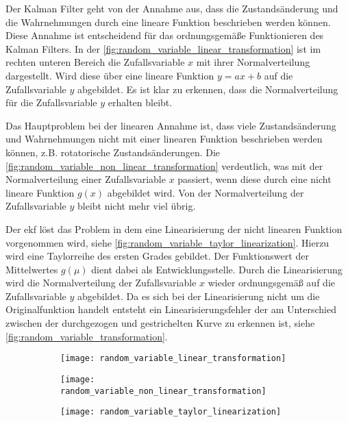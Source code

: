 Der Kalman Filter geht von der Annahme aus, dass die Zustandsänderung und die Wahrnehmungen durch eine lineare Funktion beschrieben werden können. Diese Annahme ist entscheidend für das ordnungsgemäße Funktionieren des Kalman Filters. In der \autoref{fig:random_variable_linear_transformation} ist im rechten unteren Bereich die Zufallsvariable $x$ mit ihrer Normalverteilung dargestellt. Wird diese über eine lineare Funktion $y=ax+b$ auf die Zufallsvariable $y$ abgebildet. Es ist klar zu erkennen, dass die Normalverteilung für die Zufallsvariable $y$ erhalten bleibt.

Das Hauptproblem bei der linearen Annahme ist, dass viele Zustandsänderung und Wahrnehmungen nicht mit einer linearen Funktion beschrieben werden können, z.B. rotatorische Zustandsänderungen. Die \autoref{fig:random_variable_non_linear_transformation} verdeutlich, was mit der Normalverteilung einer Zufallsvariable $x$ passiert, wenn diese durch eine nicht lineare Funktion $g(x)$ abgebildet wird. Von der Normalverteilung der Zufallsvariable $y$ bleibt nicht mehr viel übrig.

Der \Gls{ekf} löst das Problem in dem eine Linearisierung der nicht linearen Funktion vorgenommen wird, siehe \autoref{fig:random_variable_taylor_linearization}. Hierzu wird eine Taylorreihe des ersten Grades gebildet. Der Funktionswert der Mittelwertes $g(\mu)$ dient dabei als Entwicklungsstelle. Durch die Linearisierung wird die Normalverteilung der Zufallsvariable $x$ wieder ordnungsgemäß auf die Zufallsvariable $y$ abgebildet. Da es sich bei der Linearisierung nicht um die Originalfunktion handelt entsteht ein Linearisierungsfehler der am Unterschied zwischen der durchgezogen und gestrichelten Kurve zu erkennen ist, siehe \autoref{fig:random_variable_transformation}.

\begin{figure}
	\centering
	\begin{subfigure}{0.49\linewidth}
		\centering
		\texttt{[image: random\_variable\_linear\_transformation]}
		\caption{}
		\label{fig:random_variable_linear_transformation}
	\end{subfigure}
	\hfill
	\begin{subfigure}{0.49\linewidth}
		\centering
		\texttt{[image: random\_variable\_non\_linear\_transformation]}
		\caption{}
		\label{fig:random_variable_non_linear_transformation}
	\end{subfigure}
	\par
	\bigskip
	\begin{subfigure}{0.49\linewidth}
		\centering
		\texttt{[image: random\_variable\_taylor\_linearization]}
		\caption{}
		\label{fig:random_variable_taylor_linearization}
	\end{subfigure}
	\label{fig:random_variable_transformation}
\end{figure}


